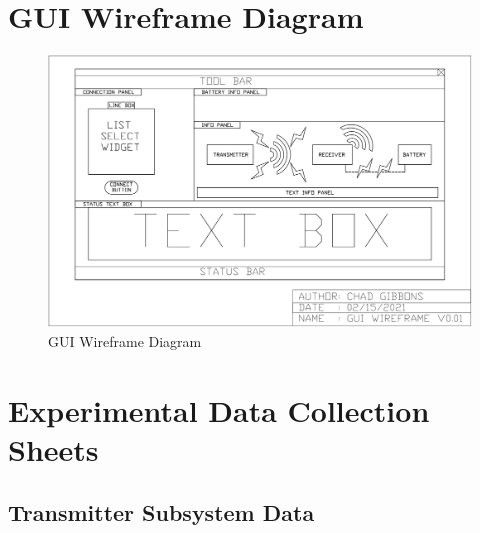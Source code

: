 \documentclass[12pt]{article}
\begin{document}
\begin{appendices}
\section{GUI Wireframe Diagram}
\hfill
\begin{figure}[h!]
\centering
\includegraphics[angle=90,width=0.74\linewidth]{gui_wireframe}
\caption{GUI Wireframe Diagram}
\end{figure}
\hfill

\pagebreak
\section{Experimental Data Collection Sheets}

\subsection{Transmitter Subsystem Data}


\end{appendices}
\end{document}
